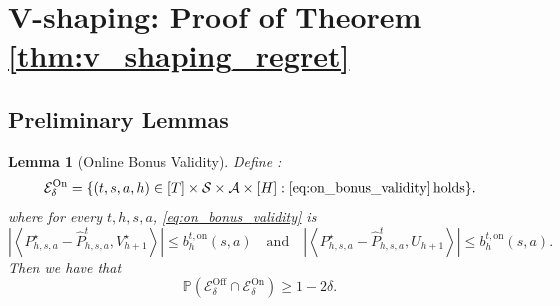\documentclass[twoside]{article}
\newtheorem{lemma}{Lemma}
\newcommand{\on}{\mathrm{on}} %
\newcommand{\bont}{b_h^{t,\on}} %
\newcommand{\highv}{U} %
\begin{document}


 
\section{V-shaping: Proof of Theorem \ref{thm:v_shaping_regret}}

\subsection{Preliminary Lemmas}

\begin{lemma}[Online Bonus Validity]
\label{lem:on_bonus_validity}
Define :
\begin{equation}\label{eq:def_Eon}
\mathcal{E}^{\mathrm{On}}_\delta=\{(t,s,a,h) \in [T]\times\mathcal{S} \times \mathcal{A} \times [H]:\eqref{eq:on_bonus_validity}\,\mathrm{holds}\}.
\end{equation}
where for every $t, h, s, a$, \eqref{eq:on_bonus_validity} is
\begin{equation}\label{eq:on_bonus_validity}
| \left \langle P^{\star}_{h,s,a}-\widehat{P}_{h,s,a}^{t},V_{h+1}^{\star} \right \rangle| \le \bont(s,a) \quad \text{and} \quad | \left \langle P_{h,s,a}^{\star}-\widehat{P}_{h,s,a}^{t}, \highv_{h+1} \right \rangle| \le \bont(s,a).
\end{equation}
Then we have that
\[ \mathbb{P}(\mathcal{E}^{\mathrm{Off}}_\delta \cap \mathcal{E}^{\mathrm{On}}_\delta) \ge 1 - 2\delta.\]
\end{lemma}
\end{document}
